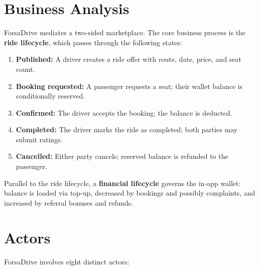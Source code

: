 \documentclass[12pt,a4paper,openright]{report}
\begin{document}
\section{Business Analysis}

ForsaDrive mediates a two-sided marketplace. The core business process is the \textbf{ride lifecycle}, which passes through the following states:

\begin{enumerate}[noitemsep]
    \item \textbf{Published:} A driver creates a ride offer with route, date, price, and seat count.
    \item \textbf{Booking requested:} A passenger requests a seat; their wallet balance is conditionally reserved.
    \item \textbf{Confirmed:} The driver accepts the booking; the balance is deducted.
    \item \textbf{Completed:} The driver marks the ride as completed; both parties may submit ratings.
    \item \textbf{Cancelled:} Either party cancels; reserved balance is refunded to the passenger.
\end{enumerate}

Parallel to the ride lifecycle, a \textbf{financial lifecycle} governs the in-app wallet: balance is loaded via top-up, decreased by bookings and possibly complaints, and increased by referral bonuses and refunds.

\section{Actors}

ForsaDrive involves eight distinct actors:
\end{document}
